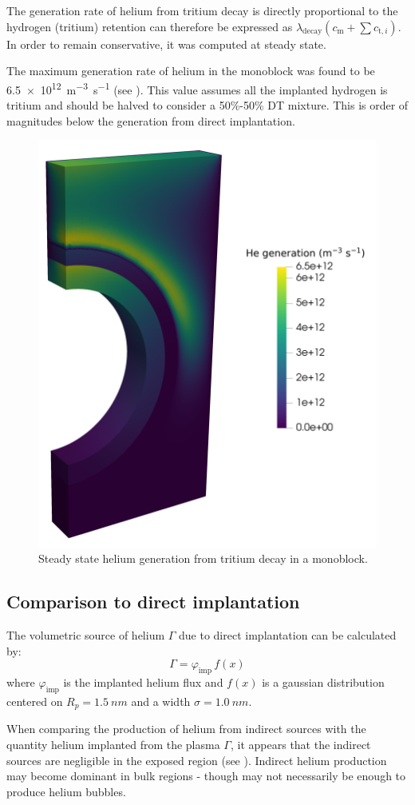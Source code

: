 The generation rate of helium from tritium decay is directly proportional to the hydrogen (tritium) retention can therefore be expressed as $\lambda_\mathrm{decay} (c_\mathrm{m} + \sum c_{\mathrm{t}, i})$.
In order to remain conservative, it was computed at steady state.

The maximum generation rate of helium in the \gls{monoblock} was found to be \SI{6.5e12}{m^{-3}.s^{-1}} (see ).
This value assumes all the implanted hydrogen is tritium and should be halved to consider a 50\%-50\% DT mixture.
This is order of magnitudes below the generation from direct implantation.

\begin{figure}
    \centering
    \includegraphics[width=0.5\linewidth]{Figures/Chapter5/he_generation_decay.png}
    \caption{Steady state helium generation from tritium decay in a monoblock.}
\end{figure}

\subsection{Comparison to direct implantation}

The volumetric source of helium $\Gamma$ due to direct implantation can be calculated by:
\begin{equation}
    \Gamma = \varphi_\mathrm{imp} \, f(x)
\end{equation}
where $\varphi_\mathrm{imp}$ is the implanted helium flux and $f(x)$ is a gaussian distribution centered on $R_p=\SI{1.5}{nm}$ and a width $\sigma=\SI{1.0}{nm}$.

When comparing the production of helium from indirect sources with the quantity helium implanted from the plasma $\Gamma$, it appears that the indirect sources are negligible in the exposed region (see ).
Indirect helium production may become dominant in bulk regions - though may not necessarily be enough to produce helium bubbles.

